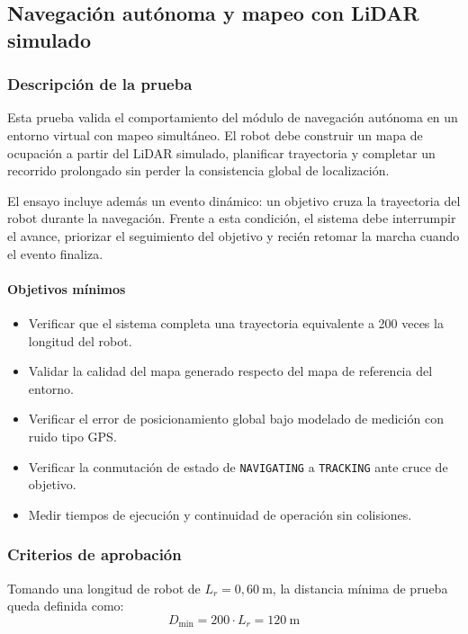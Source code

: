 \subsection{Navegación autónoma y mapeo con LiDAR simulado}

\subsubsection{Descripción de la prueba}

Esta prueba valida el comportamiento del módulo de navegación autónoma en un entorno virtual con mapeo simultáneo. El robot debe construir un mapa de ocupación a partir del LiDAR simulado, planificar trayectoria y completar un recorrido prolongado sin perder la consistencia global de localización.

El ensayo incluye además un evento dinámico: un objetivo cruza la trayectoria del robot durante la navegación. Frente a esta condición, el sistema debe interrumpir el avance, priorizar el seguimiento del objetivo y recién retomar la marcha cuando el evento finaliza.

\paragraph{Objetivos mínimos}
\begin{itemize}
    \item Verificar que el sistema completa una trayectoria equivalente a 200 veces la longitud del robot.
    \item Validar la calidad del mapa generado respecto del mapa de referencia del entorno.
    \item Verificar el error de posicionamiento global bajo modelado de medición con ruido tipo GPS.
    \item Verificar la conmutación de estado de \texttt{NAVIGATING} a \texttt{TRACKING} ante cruce de objetivo.
    \item Medir tiempos de ejecución y continuidad de operación sin colisiones.
\end{itemize}

\subsubsection{Criterios de aprobación}

Tomando una longitud de robot de $L_r = 0{,}60\ \text{m}$, la distancia mínima de prueba queda definida como:
\[
D_{\min} = 200 \cdot L_r = 120\ \text{m}
\]

